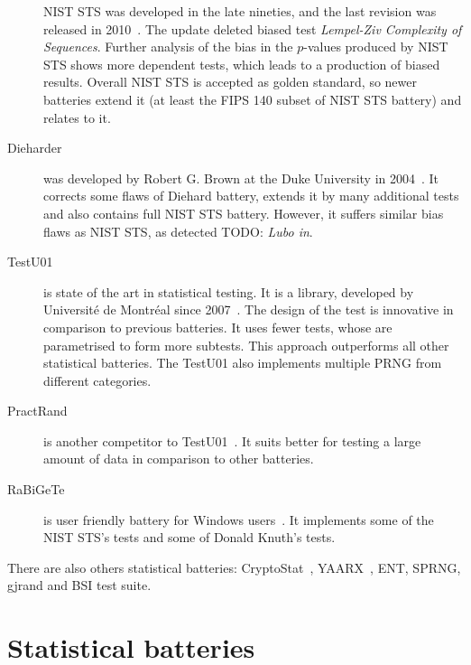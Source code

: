 \documentclass[
  print, %
  Table,   %
  nolof,     %
  nolot,     %
  11pt, %
  oneside  %
]{fithesis3}
\newcommand{\todo}[1]{TODO: \textit{#1}}
\begin{document}
\begin{description}
    NIST STS was developed in the late nineties, and the last revision was released in 2010~\cite{rukhin2001statistical}. The update deleted biased test \textit{Lempel-Ziv Complexity of Sequences}. Further analysis of the bias in the $p$-values produced by NIST STS shows more dependent tests, which leads to a production of biased results. Overall NIST STS is accepted as golden standard, so newer batteries extend it (at least the FIPS 140 subset of NIST STS battery) and relates to it. %
    \item[Dieharder] was developed by Robert G. Brown at the Duke University in 2004~\cite{brown2013dieharder}. It corrects some flaws of Diehard battery, extends it by many additional tests and also contains full NIST STS battery. However, it suffers similar bias flaws as NIST STS, as detected \todo{Lubo in}. %
    \item[TestU01] is state of the art in statistical testing. It is a library, developed by Université de Montréal since 2007~\cite{l2007testu01}. The design of the test is innovative in comparison to previous batteries. It uses fewer tests, whose are parametrised to form more subtests. This approach outperforms all other statistical batteries. The TestU01 also implements multiple PRNG from different categories. %
    \item[PractRand] is another competitor to TestU01~\cite{dotypractically}. It suits better for testing a large amount of data in comparison to other batteries.
    \item[RaBiGeTe] is user friendly battery for Windows users~\cite{rabigete}. It implements some of the NIST STS's tests and some of Donald Knuth's tests.
\end{description}

There are also others statistical batteries: CryptoStat~\cite{kaminsky2013cryptostat}, YAARX~\cite{biryukov2014automatic}, ENT, SPRNG, gjrand and BSI test suite.


\section{Statistical batteries}
\label{sec:relatwork-stat}

\end{document}
